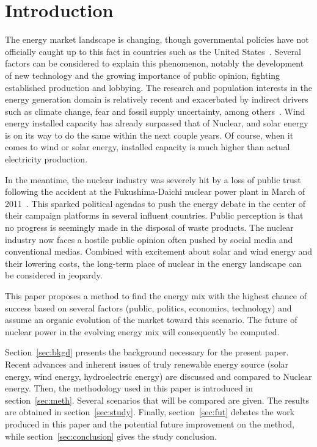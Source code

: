 \documentclass[IJPHM, 2017, 29]{PHMSociety}
\begin{document}
\section{Introduction}
\label{sec:intro}
The energy market landscape is changing, though governmental policies have not officially caught up to this fact in countries such as the United States~\citep{fershee2008changing}. Several factors can be considered to explain this phenomenon, notably the development of new technology and the growing importance of public opinion, fighting established production and lobbying. The research and population interests in the energy generation domain is relatively recent and exacerbated by indirect drivers such as climate change, fear and fossil supply uncertainty, among others~\citep{farhar1979public}. Wind energy installed capacity has already surpassed that of Nuclear, and solar energy is on its way to do the same within the next couple years. Of course, when it comes to wind or solar energy, installed capacity is much higher than actual electricity production.

In the meantime, the nuclear industry was severely hit by a loss of public trust following the accident at the Fukushima-Daichi nuclear power plant in March of 2011~\citep{braun2011fukushima}. This sparked political agendas to push the energy debate in the center of their campaign platforms in several influent countries. Public perception is that no progress is seemingly made in the disposal of waste products. The nuclear industry now faces a hostile public opinion often pushed by social media and conventional medias. Combined with excitement about solar and wind energy and their lowering costs, the long-term place of nuclear in the energy landscape can be considered in jeopardy.

This paper proposes a method to find the energy mix with the highest chance of success based on several factors (public, politics, economics, technology) and assume an organic evolution of the market toward this scenario. The future of nuclear power in the evolving energy mix will consequently be computed.

Section~\ref{sec:bkgd} presents the background necessary for the present paper. Recent advances and inherent issues of truly renewable energy source (solar energy, wind energy, hydroelectric energy) are discussed and compared to Nuclear energy. Then, the methodology used in this paper is introduced in section~\ref{sec:meth}. Several scenarios that will be compared are given. The results are obtained in section~\ref{sec:study}. Finally, section~\ref{sec:fut} debates the work produced in this paper and the potential future improvement on the method, while section~\ref{sec:conclusion} gives the study conclusion.
\end{document}
